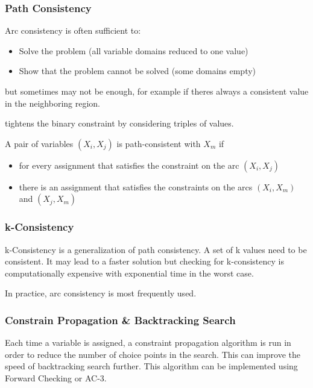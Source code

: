 \documentclass[
../../EiKI_Summary.tex,
]
{subfiles}
\begin{document}
\subsubsection{Path Consistency}
Arc consistency is often sufficient to:
\begin{itemize}
    \item Solve the problem (all variable domains reduced to one value)
    \item Show that the problem cannot be solved (some domains empty)
\end{itemize}
but sometimes may not be enough, for example if theres always a consistent value in the neighboring region.

 tightens the binary constraint by considering triples of values. 

A pair of variables $(X_i,X_j)$ is path-consistent with $X_m$ if
\begin{itemize}
    \item for every assignment that satisfies the constraint on the arc $(X_i, X_j)$
    \item there is an assignment that satisfies the constraints on the arcs $(X_i, X_m)$ and $(X_j, X_m)$
\end{itemize}

\subsubsection{k-Consistency}
k-Consistency is a generalization of path consistency. A set of k values need to be consistent. It may lead to a faster solution but checking for k-consistency is computationally expensive with exponential time in the worst case. 

In practice, arc consistency is most frequently used.

\subsubsection{Constrain Propagation \& Backtracking Search}
Each time a variable is assigned, a constraint propagation algorithm is run in order to reduce the number of choice points in the search. This can improve the speed of backtracking search further. This algorithm can be implemented using Forward Checking or AC-3.

\newpage
\end{document}

